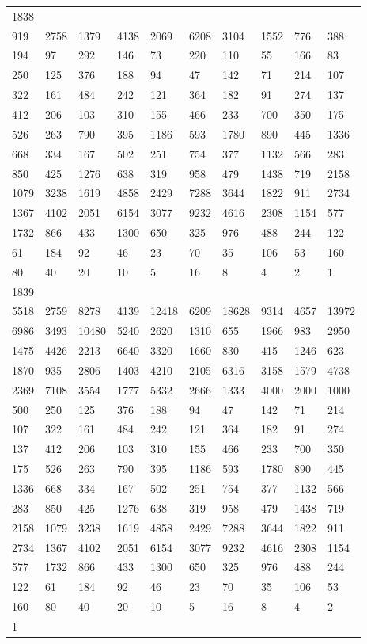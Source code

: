 \begin{longtable}{*{10}{l}}
1838&&&&&&&&&\\
919& 2758& 1379& 4138& 2069& 6208& 3104& 1552& 776& 388\\
194& 97& 292& 146& 73& 220& 110& 55& 166& 83\\
250& 125& 376& 188& 94& 47& 142& 71& 214& 107\\
322& 161& 484& 242& 121& 364& 182& 91& 274& 137\\
412& 206& 103& 310& 155& 466& 233& 700& 350& 175\\
526& 263& 790& 395& 1186& 593& 1780& 890& 445& 1336\\
668& 334& 167& 502& 251& 754& 377& 1132& 566& 283\\
850& 425& 1276& 638& 319& 958& 479& 1438& 719& 2158\\
1079& 3238& 1619& 4858& 2429& 7288& 3644& 1822& 911& 2734\\
1367& 4102& 2051& 6154& 3077& 9232& 4616& 2308& 1154& 577\\
1732& 866& 433& 1300& 650& 325& 976& 488& 244& 122\\
61& 184& 92& 46& 23& 70& 35& 106& 53& 160\\
80& 40& 20& 10& 5& 16& 8& 4& 2& 1\\

1839&&&&&&&&&\\
5518& 2759& 8278& 4139& 12418& 6209& 18628& 9314& 4657& 13972\\
6986& 3493& 10480& 5240& 2620& 1310& 655& 1966& 983& 2950\\
1475& 4426& 2213& 6640& 3320& 1660& 830& 415& 1246& 623\\
1870& 935& 2806& 1403& 4210& 2105& 6316& 3158& 1579& 4738\\
2369& 7108& 3554& 1777& 5332& 2666& 1333& 4000& 2000& 1000\\
500& 250& 125& 376& 188& 94& 47& 142& 71& 214\\
107& 322& 161& 484& 242& 121& 364& 182& 91& 274\\
137& 412& 206& 103& 310& 155& 466& 233& 700& 350\\
175& 526& 263& 790& 395& 1186& 593& 1780& 890& 445\\
1336& 668& 334& 167& 502& 251& 754& 377& 1132& 566\\
283& 850& 425& 1276& 638& 319& 958& 479& 1438& 719\\
2158& 1079& 3238& 1619& 4858& 2429& 7288& 3644& 1822& 911\\
2734& 1367& 4102& 2051& 6154& 3077& 9232& 4616& 2308& 1154\\
577& 1732& 866& 433& 1300& 650& 325& 976& 488& 244\\
122& 61& 184& 92& 46& 23& 70& 35& 106& 53\\
160& 80& 40& 20& 10& 5& 16& 8& 4& 2\\
1& \\


\end{longtable}
